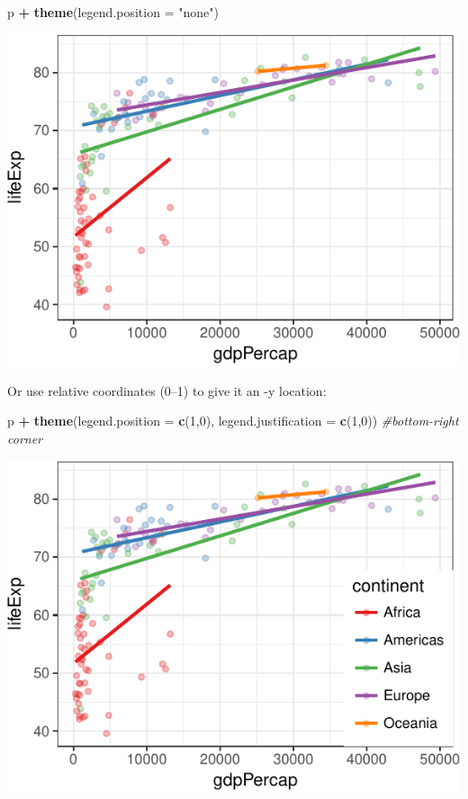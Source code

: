 \documentclass[12pt,]{krantz}
\makeatletter
\newenvironment{Shaded}{\begin{snugshade}}{\end{snugshade}}
\newcommand{\CommentTok}[1]{\textcolor[rgb]{0.56,0.35,0.01}{\textit{#1}}}
\newcommand{\DataTypeTok}[1]{\textcolor[rgb]{0.13,0.29,0.53}{#1}}
\newcommand{\DecValTok}[1]{\textcolor[rgb]{0.00,0.00,0.81}{#1}}
\newcommand{\KeywordTok}[1]{\textcolor[rgb]{0.13,0.29,0.53}{\textbf{#1}}}
\newcommand{\NormalTok}[1]{#1}
\newcommand{\OperatorTok}[1]{\textcolor[rgb]{0.81,0.36,0.00}{\textbf{#1}}}
\newcommand{\StringTok}[1]{\textcolor[rgb]{0.31,0.60,0.02}{#1}}
\newenvironment{kframe}{%
\medskip{}
\setlength{\fboxsep}{.8em}
 \def\at@end@of@kframe{}%
 \ifinner\ifhmode%
  \def\at@end@of@kframe{\end{minipage}}%
  \begin{minipage}{\columnwidth}%
 \fi\fi%
 \def\FrameCommand##1{\hskip\@totalleftmargin \hskip-\fboxsep
 \colorbox{shadecolor}{##1}\hskip-\fboxsep
     \hskip-\linewidth \hskip-\@totalleftmargin \hskip\columnwidth}%
 \MakeFramed {\advance\hsize-\width
   \@totalleftmargin\z@ \linewidth\hsize
   \@setminipage}}%
 {\par\unskip\endMakeFramed%
 \at@end@of@kframe}
\renewenvironment{Shaded}{\begin{kframe}}{\end{kframe}}
\theoremstyle{definition}
\theoremstyle{definition}
\theoremstyle{definition}
\theoremstyle{remark}
\makeatother
\begin{document}
\begin{Shaded}
\begin{Highlighting}[]
\NormalTok{p }\OperatorTok{+}
\StringTok{  }\KeywordTok{theme}\NormalTok{(}\DataTypeTok{legend.position =} \StringTok{"none"}\NormalTok{)}
\end{Highlighting}
\end{Shaded}

\includegraphics{05_fine_tuning_plots_files/figure-latex/unnamed-chunk-20-1.pdf}

Or use relative coordinates (0--1) to give it an -y location:

\begin{Shaded}
\begin{Highlighting}[]
\NormalTok{p }\OperatorTok{+}
\StringTok{  }\KeywordTok{theme}\NormalTok{(}\DataTypeTok{legend.position      =} \KeywordTok{c}\NormalTok{(}\DecValTok{1}\NormalTok{,}\DecValTok{0}\NormalTok{),}
        \DataTypeTok{legend.justification =} \KeywordTok{c}\NormalTok{(}\DecValTok{1}\NormalTok{,}\DecValTok{0}\NormalTok{)) }\CommentTok{#bottom-right corner}
\end{Highlighting}
\end{Shaded}

\includegraphics{05_fine_tuning_plots_files/figure-latex/unnamed-chunk-21-1.pdf}
\end{document}
